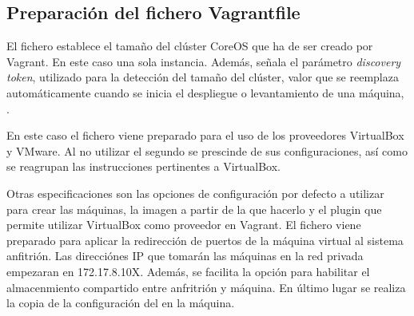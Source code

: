 \begin{codelisting}
\label{code:cloud-config1}
\end{codelisting}

\subsection{Preparación del fichero Vagrantfile}

El fichero  establece el tamaño del clúster CoreOS que ha de ser creado por Vagrant. En este caso una sola instancia. Además, señala el parámetro \textit{discovery token}, utilizado para la detección del tamaño del clúster, valor que se reemplaza automáticamente cuando se inicia el despliegue o levantamiento de una máquina, .

En este caso el fichero viene preparado para el uso de los proveedores VirtualBox y VMware. Al no utilizar el segundo se prescinde de sus configuraciones, así como se reagrupan las instrucciones pertinentes a VirtualBox.

Otras especificaciones son las opciones de configuración por defecto a utilizar para crear las máquinas, la imagen a partir de la que hacerlo y el plugin que permite utilizar VirtualBox como proveedor en Vagrant. El fichero viene preparado para aplicar la redirección de puertos de la máquina virtual al sistema anfitrión. Las direcciónes IP que tomarán las máquinas en la red privada empezaran en 172.17.8.10X. Además, se facilita la opción para habilitar el almacenmiento compartido entre anfritrión y máquina. En último lugar se realiza la copia de la configuración del  en la máquina.

